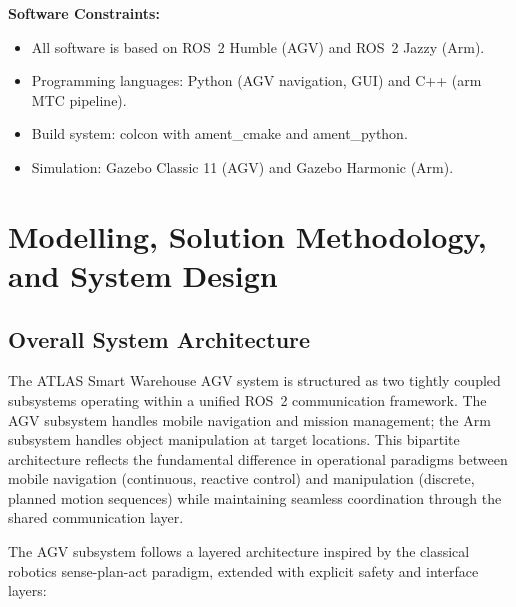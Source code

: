 \documentclass[12pt,a4paper,oneside]{report}
\begin{document}
\textbf{Software Constraints:}
\begin{itemize}
\item All software is based on ROS~2 Humble (AGV) and ROS~2 Jazzy (Arm).
\item Programming languages: Python (AGV navigation, GUI) and C++ (arm MTC pipeline).
\item Build system: colcon with ament\_cmake and ament\_python.
\item Simulation: Gazebo Classic 11 (AGV) and Gazebo Harmonic (Arm).
\end{itemize}


\chapter{Modelling, Solution Methodology, and System Design}

\section{Overall System Architecture}

The ATLAS Smart Warehouse AGV system is structured as two tightly coupled subsystems operating within a unified ROS~2 communication framework. The AGV subsystem handles mobile navigation and mission management; the Arm subsystem handles object manipulation at target locations. This bipartite architecture reflects the fundamental difference in operational paradigms between mobile navigation (continuous, reactive control) and manipulation (discrete, planned motion sequences) while maintaining seamless coordination through the shared communication layer.

The AGV subsystem follows a layered architecture inspired by the classical robotics sense-plan-act paradigm, extended with explicit safety and interface layers:
\end{document}
